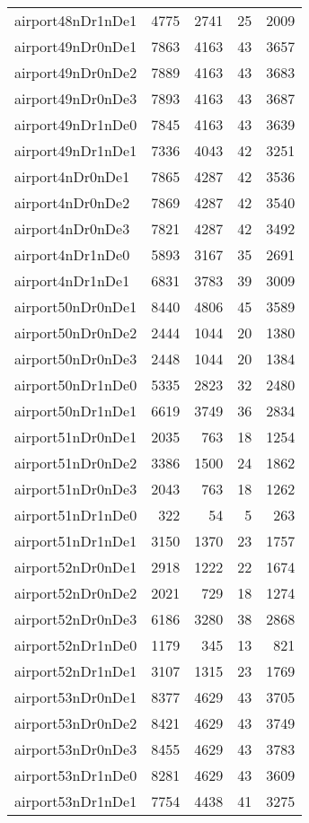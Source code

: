 \documentclass[../../../thesis.tex]{subfiles}
\begin{document}
\begin{longtable}{lrrrr}
airport48nDr1nDe1 & 4775 & 2741 & 25 & 2009 \\
airport49nDr0nDe1 & 7863 & 4163 & 43 & 3657 \\
airport49nDr0nDe2 & 7889 & 4163 & 43 & 3683 \\
airport49nDr0nDe3 & 7893 & 4163 & 43 & 3687 \\
airport49nDr1nDe0 & 7845 & 4163 & 43 & 3639 \\
airport49nDr1nDe1 & 7336 & 4043 & 42 & 3251 \\
airport4nDr0nDe1 & 7865 & 4287 & 42 & 3536 \\
airport4nDr0nDe2 & 7869 & 4287 & 42 & 3540 \\
airport4nDr0nDe3 & 7821 & 4287 & 42 & 3492 \\
airport4nDr1nDe0 & 5893 & 3167 & 35 & 2691 \\
airport4nDr1nDe1 & 6831 & 3783 & 39 & 3009 \\
airport50nDr0nDe1 & 8440 & 4806 & 45 & 3589 \\
airport50nDr0nDe2 & 2444 & 1044 & 20 & 1380 \\
airport50nDr0nDe3 & 2448 & 1044 & 20 & 1384 \\
airport50nDr1nDe0 & 5335 & 2823 & 32 & 2480 \\
airport50nDr1nDe1 & 6619 & 3749 & 36 & 2834 \\
airport51nDr0nDe1 & 2035 & 763 & 18 & 1254 \\
airport51nDr0nDe2 & 3386 & 1500 & 24 & 1862 \\
airport51nDr0nDe3 & 2043 & 763 & 18 & 1262 \\
airport51nDr1nDe0 & 322 & 54 & 5 & 263 \\
airport51nDr1nDe1 & 3150 & 1370 & 23 & 1757 \\
airport52nDr0nDe1 & 2918 & 1222 & 22 & 1674 \\
airport52nDr0nDe2 & 2021 & 729 & 18 & 1274 \\
airport52nDr0nDe3 & 6186 & 3280 & 38 & 2868 \\
airport52nDr1nDe0 & 1179 & 345 & 13 & 821 \\
airport52nDr1nDe1 & 3107 & 1315 & 23 & 1769 \\
airport53nDr0nDe1 & 8377 & 4629 & 43 & 3705 \\
airport53nDr0nDe2 & 8421 & 4629 & 43 & 3749 \\
airport53nDr0nDe3 & 8455 & 4629 & 43 & 3783 \\
airport53nDr1nDe0 & 8281 & 4629 & 43 & 3609 \\
airport53nDr1nDe1 & 7754 & 4438 & 41 & 3275 \\

\end{longtable}
\end{document}
